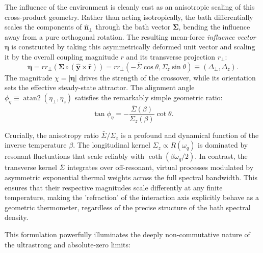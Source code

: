 The influence of the environment is cleanly cast as an anisotropic scaling of this cross-product geometry. Rather than acting isotropically, the bath differentially scales the components of $\hat{\boldsymbol{n}}_\perp$ through the bath vector $\boldsymbol{\Sigma}$, bending the influence away from a pure orthogonal rotation. The resulting mean-force \emph{influence vector} $\boldsymbol{\eta}$ is constructed by taking this asymmetrically deformed unit vector and scaling it by the overall coupling magnitude $r$ and its transverse projection $r_\perp$:
\begin{equation}
    \boldsymbol{\eta} = r r_\perp \left( \boldsymbol{\Sigma} \circ (\hat{\boldsymbol{y}} \times \hat{\boldsymbol{r}}) \right) = r r_\perp (-\bar{\Sigma} \cos\theta, \Sigma_z \sin\theta) \equiv (\Delta_\perp, \Delta_z).
\end{equation}
The magnitude $\chi = |\boldsymbol{\eta}|$ drives the strength of the crossover, while its orientation sets the effective steady-state attractor. The alignment angle $\phi_\eta \equiv \operatorname{atan2}(\eta_\perp, \eta_z)$ satisfies the remarkably simple geometric ratio:
\begin{equation}
    \tan\phi_\eta = -\frac{\bar{\Sigma}(\beta)}{\Sigma_z(\beta)} \cot\theta.
    \label{eq:attractor_angle_ratio}
\end{equation}

Crucially, the anisotropy ratio $\bar{\Sigma}/\Sigma_z$ is a profound and dynamical function of the inverse temperature $\beta$. The longitudinal kernel $\Sigma_z \propto R(\omega_q)$ is dominated by resonant fluctuations that scale reliably with $\coth(\beta\omega_q/2)$. In contrast, the transverse kernel $\bar{\Sigma}$ integrates over off-resonant, virtual processes modulated by asymmetric exponential thermal weights across the full spectral bandwidth. This ensures that their respective magnitudes scale differently at any finite temperature, making the 'refraction' of the interaction axis explicitly behave as a geometric thermometer, regardless of the precise structure of the bath spectral density.

This formulation powerfully illuminates the deeply non-commutative nature of the ultrastrong and absolute-zero limits:

